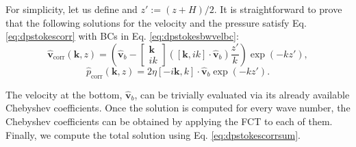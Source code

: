 \documentclass[ twoside,openright,titlepage,numbers=noenddot,%
headinclude,footinclude,cleardoublepage=empty,abstract=on,
BCOR=5mm,paper=b5,fontsize=11pt, dvipsnames
]{scrreprt}
\renewcommand{\vec}[1]{\bm{#1}}
\newcommand{\fou}[1]{\widehat{#1}}
\newcommand{\fvel}{v}
\newcommand{\corr}{\text{corr}}
\begin{document}
For simplicity, let us define and $z':=(z+H)/2$.
It is straightforward to prove that the following solutions for the velocity and the pressure satisfy Eq. \eqref{eq:dpstokescorr} with \glspl{BC} in Eq. \eqref{eq:dpstokesbwvelbc}:
\begin{equation}
  \fou{\vec{\fvel}}_{\corr}(\vec{k}, z) = \left(  \fou{\vec{\fvel}}_b -
    \begin{bmatrix}
    \vec{k}\\
    ik
  \end{bmatrix}
  \left(\left[\vec{k},ik\right]\cdot\fou{\vec{\fvel}}_b\right) \frac{z'}{k}\right)\exp\left(-kz'\right),
\end{equation}
\begin{equation}
  \fou{p}_{\corr}(\vec{k}, z) = 2\eta \left[-i\vec{k},k\right]\cdot\fou{\vec{\fvel}}_b\exp\left(-kz'\right).
\end{equation}

The velocity at the bottom, $\fou{\vec{\fvel}}_b$, can be trivially evaluated via its already available Chebyshev coefficients. Once the solution is computed for every wave number, the Chebyshev coefficients can be obtained by applying the \gls{FCT} to each of them. Finally, we compute the total solution using Eq. \eqref{eq:dpstokescorrsum}.
\end{document}
